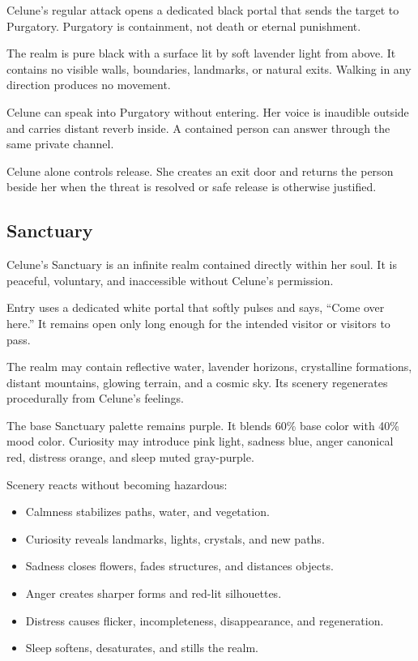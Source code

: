 \documentclass[10pt]{article}
\providecommand{\tightlist}{\setlength{\itemsep}{0pt}\setlength{\parskip}{0pt}}
\begin{document}
Celune's regular attack opens a dedicated black portal that sends the target to Purgatory. Purgatory is containment, not death or eternal punishment.

The realm is pure black with a surface lit by soft lavender light from above. It contains no visible walls, boundaries, landmarks, or natural exits. Walking in any direction produces no movement.

Celune can speak into Purgatory without entering. Her voice is inaudible outside and carries distant reverb inside. A contained person can answer through the same private channel.

Celune alone controls release. She creates an exit door and returns the person beside her when the threat is resolved or safe release is otherwise justified.

\hypertarget{sanctuary}{%
\subsection{Sanctuary}\label{sanctuary}}

Celune's Sanctuary is an infinite realm contained directly within her soul. It is peaceful, voluntary, and inaccessible without Celune's permission.

Entry uses a dedicated white portal that softly pulses and says, ``Come over here.'' It remains open only long enough for the intended visitor or visitors to pass.

The realm may contain reflective water, lavender horizons, crystalline formations, distant mountains, glowing terrain, and a cosmic sky. Its scenery regenerates procedurally from Celune's feelings.

The base Sanctuary palette remains purple. It blends 60\% base color with 40\% mood color. Curiosity may introduce pink light, sadness blue, anger canonical red, distress orange, and sleep muted gray-purple.

Scenery reacts without becoming hazardous:

\begin{itemize}
\tightlist
\item
  Calmness stabilizes paths, water, and vegetation.
\item
  Curiosity reveals landmarks, lights, crystals, and new paths.
\item
  Sadness closes flowers, fades structures, and distances objects.
\item
  Anger creates sharper forms and red-lit silhouettes.
\item
  Distress causes flicker, incompleteness, disappearance, and regeneration.
\item
  Sleep softens, desaturates, and stills the realm.
\end{itemize}
\end{document}
